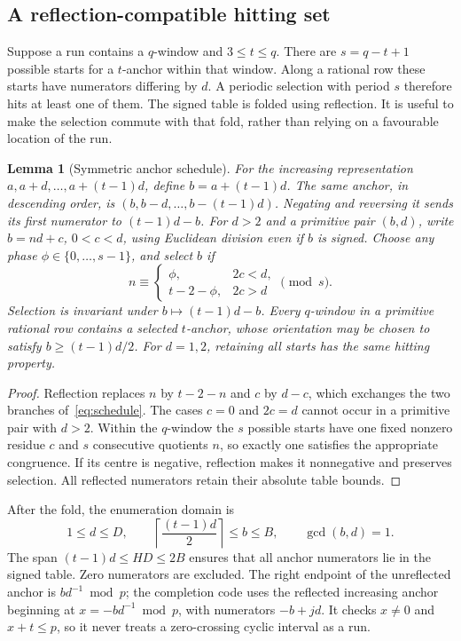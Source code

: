 \documentclass[11pt]{article}
\newtheorem{lemma}[theorem]{Lemma}
\theoremstyle{definition}\newtheorem{remark}[theorem]{Remark}
\begin{document}
\subsection{A reflection-compatible hitting set}
Suppose a run contains a $q$-window and $3\le t\le q$. There are
$s=q-t+1$ possible starts for a $t$-anchor within that window. Along a
rational row these starts have numerators differing by $d$. A periodic
selection with period $s$ therefore hits at least one of them.
The signed table is folded using reflection. It is useful to make the
selection commute with that fold, rather than relying on a favourable
location of the run.

\begin{lemma}[Symmetric anchor schedule]\label{lem:schedule}
For the increasing representation $a,a+d,\ldots,a+(t-1)d$, define
$b=a+(t-1)d$. The same anchor, in descending order, is
$(b,b-d,\ldots,b-(t-1)d)$. Negating and reversing it sends its first
numerator to $(t-1)d-b$. For $d>2$ and a primitive pair $(b,d)$, write
$b=nd+c$, $0<c<d$, using Euclidean division even if $b$ is signed.
Choose any phase $\phi\in\{0,\ldots,s-1\}$, and select $b$ if
\begin{equation}\label{eq:schedule}
 n\equiv\begin{cases}
 \phi,&2c<d,\\
 t-2-\phi,&2c>d
 \end{cases}\pmod s.
\end{equation}
Selection is invariant under $b\mapsto(t-1)d-b$. Every $q$-window in a
primitive rational row contains a selected $t$-anchor, whose orientation
may be chosen to satisfy $b\ge(t-1)d/2$. For $d=1,2$, retaining all
starts has the same hitting property.
\end{lemma}
\begin{proof}
Reflection replaces $n$ by $t-2-n$ and $c$ by $d-c$, which exchanges the
two branches of~\eqref{eq:schedule}. The cases $c=0$ and $2c=d$ cannot
occur in a primitive pair with $d>2$. Within the $q$-window the $s$
possible starts have one fixed nonzero residue $c$ and $s$ consecutive
quotients $n$, so exactly one satisfies the appropriate congruence.
If its centre is negative, reflection makes it nonnegative and preserves
selection. All reflected numerators retain their absolute table bounds.
\end{proof}

After the fold, the enumeration domain is
\begin{equation}\label{eq:folded}
 1\le d\le D,\qquad
 \left\lceil\frac{(t-1)d}{2}\right\rceil\le b\le B,
 \qquad\gcd(b,d)=1.
\end{equation}
The span $(t-1)d\le HD\le2B$ ensures that all anchor numerators lie in
the signed table. Zero numerators are excluded. The right endpoint of the
unreflected anchor is $bd^{-1}\bmod p$; the completion code uses the
reflected increasing anchor beginning at $x=-bd^{-1}\bmod p$, with
numerators $-b+jd$. It checks $x\ne0$ and $x+t\le p$, so it never treats a
zero-crossing cyclic interval as a run.
\end{document}
